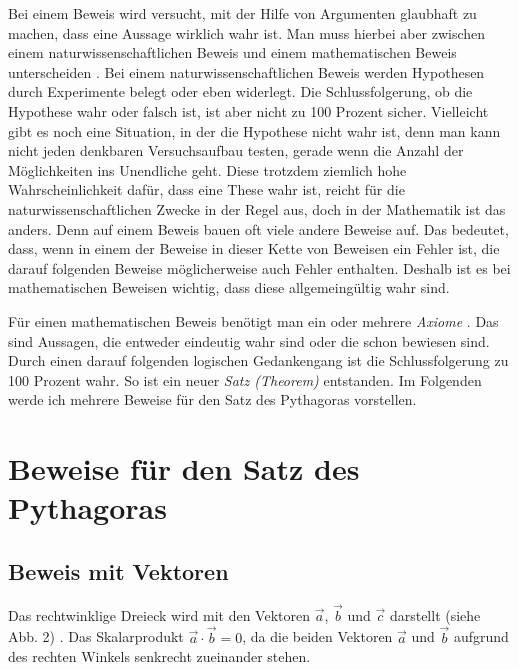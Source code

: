 \documentclass[a4paper,12pt]{article}
\begin{document}
Bei einem Beweis wird versucht, mit der Hilfe von Argumenten glaubhaft zu machen, dass eine Aussage wirklich wahr ist. Man muss hierbei aber zwischen einem naturwissenschaftlichen Beweis und einem mathematischen Beweis unterscheiden \cite[S. 44-50]{Buch}. Bei einem naturwissenschaftlichen Beweis werden Hypothesen durch Experimente belegt oder eben widerlegt. Die Schlussfolgerung, ob die Hypothese wahr oder falsch ist, ist aber nicht zu 100 Prozent sicher. Vielleicht gibt es noch eine Situation, in der die Hypothese nicht wahr ist, denn man kann nicht jeden denkbaren Versuchsaufbau testen, gerade wenn die Anzahl der Möglichkeiten ins Unendliche geht. Diese trotzdem ziemlich hohe Wahrscheinlichkeit dafür, dass eine These wahr ist, reicht für die naturwissenschaftlichen Zwecke in der Regel aus, doch in der Mathematik ist das anders. Denn auf einem Beweis bauen oft viele andere Beweise auf. Das bedeutet, dass, wenn in einem der Beweise in dieser Kette von Beweisen ein Fehler ist, die darauf folgenden Beweise möglicherweise auch Fehler enthalten. Deshalb ist es bei mathematischen Beweisen wichtig, dass diese  allgemeingültig wahr sind.

Für einen mathematischen Beweis benötigt man ein oder mehrere \emph{Axiome} \cite{Beweise}. Das sind Aussagen, die entweder eindeutig wahr sind oder die schon bewiesen sind. Durch einen darauf folgenden logischen Gedankengang ist die Schlussfolgerung zu 100 Prozent wahr. So ist ein neuer \emph{Satz (Theorem)} entstanden. Im Folgenden werde ich mehrere Beweise für den Satz des Pythagoras vorstellen.

\newpage
\section{Beweise für den Satz des Pythagoras}

\subsection{Beweis mit Vektoren}

\begin{figwindow}

Das rechtwinklige Dreieck wird mit den Vektoren $\vec{a}$, $\vec{b}$ und $\vec{c}$ darstellt (siehe Abb. 2) \cite{BeweisVektoren}. Das Skalarprodukt $\vec{a} \cdot \vec{b} = 0$, da die beiden Vektoren $\vec{a}$ und $\vec{b}$ aufgrund des rechten Winkels senkrecht zueinander stehen.

\end{figwindow}
\end{document}
